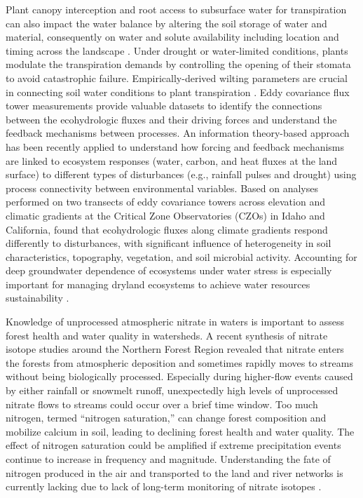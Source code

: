 \documentclass[preprint,review, 12pt]{elsarticle}
\begin{document}
Plant canopy interception and root access to subsurface water for transpiration can also impact the water balance by altering the soil storage of water and material, consequently on water and solute availability including location and timing across the landscape \citep{Brauman2015}. Under drought or water-limited conditions, plants modulate the transpiration demands by controlling the opening of their stomata to avoid catastrophic failure. Empirically-derived wilting parameters are crucial in connecting soil water conditions to plant transpiration \citep{Fang2017b,Chen2008}. Eddy covariance flux tower measurements \citep{Baldocchi2001} provide valuable datasets to identify the connections between the ecohydrologic fluxes and their driving forces and understand the feedback mechanisms between processes. An information theory-based approach \citep{Goodwell2018a} has been recently applied to understand how forcing and feedback mechanisms are linked to ecosystem responses (water, carbon, and heat fluxes at the land surface) to different types of disturbances (e.g., rainfall pulses and drought) using process connectivity between environmental variables. Based on analyses performed on two transects of eddy covariance towers across elevation and climatic gradients at the Critical Zone Observatories (CZOs) in Idaho and California, \citet{Goodwell2018a} found that ecohydrologic fluxes along climate gradients respond differently to disturbances, with significant influence of heterogeneity in soil characteristics, topography, vegetation, and soil microbial activity. Accounting for deep groundwater dependence of ecosystems under water stress is especially important for managing dryland ecosystems to achieve water resources sustainability \citep{McDonnell2018b,Miller2010}.

Knowledge of unprocessed atmospheric nitrate in waters is important to assess forest health and water quality in watersheds. A recent synthesis \citep{Sebestyen2019} of nitrate isotope studies around the Northern Forest Region revealed that nitrate enters the forests from atmospheric deposition and sometimes rapidly moves to streams without being biologically processed. Especially during higher-flow events caused by either rainfall or snowmelt runoff, unexpectedly high levels of unprocessed nitrate flows to streams could occur over a brief time window. Too much nitrogen, termed “nitrogen saturation,” can change forest composition and mobilize calcium in soil, leading to declining forest health and water quality. The effect of nitrogen saturation could be amplified if extreme precipitation events continue to increase in frequency and magnitude. Understanding the fate of nitrogen produced in the air and transported to the land and river networks is currently lacking due to lack of long-term monitoring of nitrate isotopes \citep{Schlesinger2009}.
\end{document}
